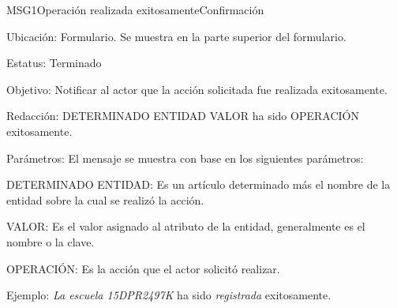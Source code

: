 \begin{mensaje}{MSG1}{Operación realizada exitosamente}{Confirmación}
    \item[Ubicación:] Formulario. Se muestra en la parte superior del formulario.
    \item[Estatus:] Terminado
    \item[Objetivo:] Notificar al actor que la acción solicitada fue realizada exitosamente.
    \item[Redacción:] DETERMINADO ENTIDAD VALOR ha sido OPERACIÓN exitosamente.
    \item[Parámetros:] El mensaje se muestra con base en los siguientes parámetros:
    \begin{Citemize}
	\item DETERMINADO ENTIDAD: Es un artículo determinado más el nombre de la entidad sobre la cual se realizó la acción.
	\item VALOR: Es el valor asignado al atributo de la entidad, generalmente es el nombre o la clave.
	\item OPERACIÓN: Es la acción que el actor solicitó realizar.
    \end{Citemize}
    \item[Ejemplo:] {\em La escuela 15DPR2497K} ha sido {\em registrada} exitosamente.
\end{mensaje}